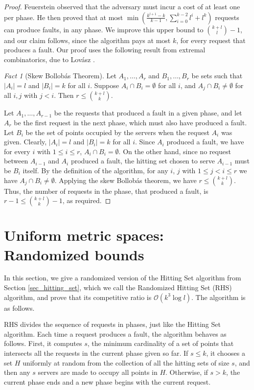 \documentclass[11pt]{article}
\theoremstyle{plain}\newtheorem{theorem}{Theorem}
\theoremstyle{definition}
\theoremstyle{remark}
\newtheorem{fact}{Fact}
\begin{document}
\begin{proof}
Feuerstein observed that the adversary must incur a cost of at least one per phase. He then proved that at most $\min\left(\frac{k^{l+1}-k}{k-1},\sum_{i=0}^{k-2}l^i+l^k\right)$ requests can produce faults, in any phase. We improve this upper bound to ${{k+l}\choose{l}}-1$, and our claim follows, since the algorithm pays at most $k$, for every request that produces a fault. Our proof uses the following result from extremal combinatorics, due to Lov\'{a}sz \cite{Lovasz_skewBollobas}.

\begin{fact}[Skew Bollob\'{a}s Theorem]
Let $A_1,\ldots,A_r$ and $B_1,\ldots,B_r$ be sets such that $|A_i|=l$ and $|B_i|=k$ for all $i$. Suppose $A_i\cap B_i=\emptyset$ for all $i$, and $A_j\cap B_i\neq\emptyset$ for all $i,j$ with $j<i$. Then $r\leq{{k+l}\choose{k}}$.
\end{fact}

Let $A_1,\ldots, A_{r-1}$ be the requests that produced a fault in a given phase, and let $A_r$ be the first request in the next phase, which must also have produced a fault. Let $B_i$ be the set of points occupied by the servers when the request $A_i$ was given. Clearly, $|A_i|=l$ and $|B_i|=k$ for all $i$.
Since $A_i$ produced a fault, we have for every $i$ with $1\leq i\leq r$, $A_i\cap B_i=\emptyset$. 
On the other hand, since no request between $A_{i-1}$ and $A_i$ produced a fault, the hitting set chosen to serve $A_{i-1}$ must be $B_i$ itself. By the definition of the algorithm, for any $i$, $j$ with $1\leq j<i\leq r$ we have $A_j\cap B_i\neq\emptyset$. 
Applying the skew Bollob\'{a}s theorem, we have $r\leq{{k+l}\choose{k}}$. Thus, the number of requests in the phase, that produced a fault, is $r-1\leq{{k+l}\choose{k}}-1$, as required.
\end{proof}

\section{Uniform metric spaces: Randomized bounds}\label{sec_uniform_random}

In this section, we give a randomized version of the Hitting Set algorithm from Section \ref{sec_hitting_set}, which we call the Randomized Hitting Set (RHS) algorithm, and prove that its competitive ratio is $\mathcal{O}(k^3\log l)$. The algorithm is as follows.

RHS divides the sequence of requests in phases, just like the Hitting Set algorithm. Each time a request produces a fault, the algorithm behaves as follows. First, it computes $s$, the minimum cardinality of a set of points that intersects all the requests in the current phase given so far. If $s\leq k$, it chooses a set $H$ uniformly at random from the collection of all the hitting sets of size $s$, and then any $s$ servers are made to occupy all points in $H$. Otherwise, if $s>k$, the current phase ends and a new phase begins with the current request.
\end{document}
